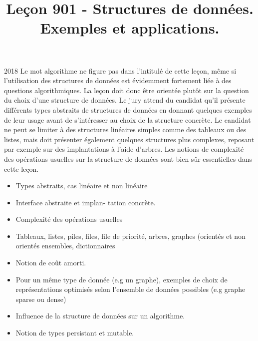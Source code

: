 \documentclass{agregfiche}
\title{Leçon 901 - Structures de données. Exemples et applications.}
\begin{document}
\maketitle

\secrapports
\begin{rapport}{2018}
	Le mot algorithme ne figure pas dans l’intitulé de cette leçon, même si l’utilisation des structures de
	données est évidemment fortement liée à des questions algorithmiques. La leçon doit donc être orientée
	plutôt sur la question du choix d’une structure de données. Le jury attend du candidat qu’il présente
	différents types abstraits de structures de données en donnant quelques exemples de leur usage avant de
	s’intéresser au choix de la structure concrète. Le candidat ne peut se limiter à des structures linéaires
	simples comme des tableaux ou des listes, mais doit présenter également quelques structures plus
	complexes, reposant par exemple sur des implantations à l’aide d’arbres. Les notions de complexité des
	opérations usuelles sur la structure de données sont bien sûr essentielles dans cette leçon.
\end{rapport}

\secindispensables

\begin{itemize}
	\item  Types abstraits, cas linéaire et non linéaire
	\item Interface abstraite et implan-
	tation concrète.
	\item Complexité des opérations usuelles
\end{itemize}

\secasavoir

\begin{itemize}
	\item  Tableaux, listes, piles, files, file de priorité, arbres, graphes (orientés et non orientés ensembles, dictionnaires
	\item Notion de coût amorti.
	\item Pour un même type de donnée (e.g un graphe), exemples de choix de représentations optimisés selon l'ensemble de données possibles (e.g graphe sparse ou dense)
	\item Influence de la structure de données sur un algorithme.
	\item Notion de types persistant et mutable.
	
\end{itemize}

\secidees
\end{document}

